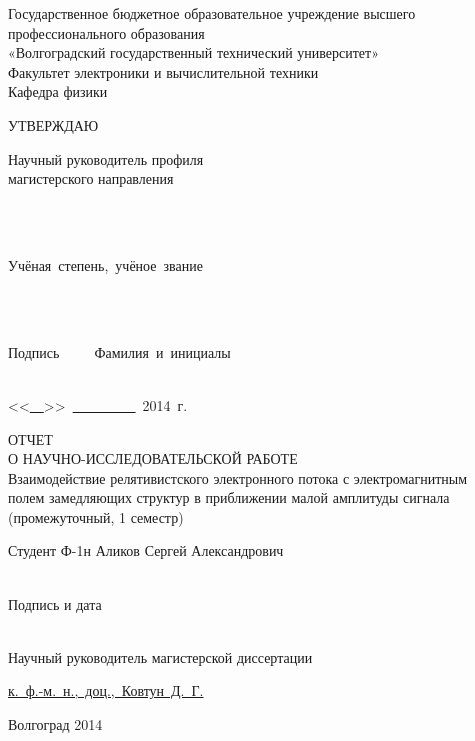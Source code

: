 \documentclass[a4paper,14pt]{extreport} %
\newcommand{\ultext}[4]{
	\parbox[t]{#1}{
		\centering
		\underline{\hspace{#2}#3\hspace{#2}}\\
		\vspace{-3mm}
		{\footnotesize\hfill#4\hfill}
	}	
}
\newcommand{\uldate}[3]{
	<<#1>>~#2~#3~г.
}
\begin{document}
\renewcommand{\contentsname}{Содержание}

\begin{titlepage}
	\begin{center}
		Государственное бюджетное образовательное учреждение высшего
		профессионального образования\\
		«Волгоградский государственный технический университет»\\
		\vspace{1em}
		Факультет электроники  и  вычислительной  техники\\
		\vspace{0.6em}
		Кафедра физики\\ 
	\end{center}
	\begin{flushright}
		УТВЕРЖДАЮ\\
		\vspace{0.6em}
		\parbox{7cm}{
		Научный руководитель профиля \\
		магистерского направления
		}\\
		\vspace{1em}
		\ultext{7cm}{3.5cm}{}{Учёная~степень{,}~учёное~звание}\\
		\vspace{1em}
		\ultext{6cm}{3cm}{}{Подпись~~~~~Фамилия~и~инициалы}\\
		\uldate{\underline{~~}}{\underline{~~~~~~~~~}}{2014}
	\end{flushright}
	\vfil
	\begin{center}
		ОТЧЕТ\\
		О  НАУЧНО-ИССЛЕДОВАТЕЛЬСКОЙ РАБОТЕ\\
		\vspace{1em}
		Взаимодействие релятивистского электронного потока с электромагнитным\\
		полем замедляющих структур в приближении малой амплитуды сигнала\\
		(промежуточный, 1 семестр)
	\end{center}
	Студент \hfill Ф-1н Аликов Сергей Александрович \ultext{4cm}{2cm}{}{Подпись и дата}\\
	Научный руководитель магистерской диссертации \hfill
	\begin{flushright}
		\underline{к.~ф.-м.~н.,~доц.,~Ковтун~Д.~Г.}
	\end{flushright}
	\vfill
	\begin{center}
		Волгоград 2014
	\end{center}
\end{titlepage}
\end{document}
